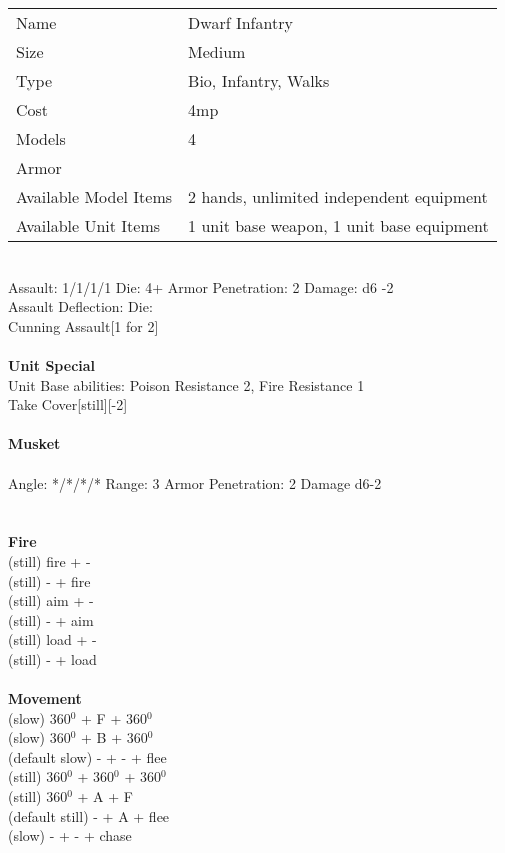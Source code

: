 \begin{tabular}{ll}
  Name & Dwarf Infantry \\
  Size & Medium\\
  Type & Bio, Infantry, Walks\\
  Cost & 4mp\\
  Models & 4\\
  Armor & \\
  Available Model Items & 2 hands, unlimited independent equipment \\
  Available Unit Items & 1 unit base weapon, 1 unit base equipment \\
\end{tabular}

\ \\
Assault: 1/1/1/1 Die: 4+ Armor Penetration: 2 Damage: d6 -2 \\
Assault Deflection:  Die: \\
\indent Cunning Assault[1 for 2] \\
\ \\

{\bf Unit Special} \\
Unit Base abilities: Poison Resistance 2, Fire Resistance 1\\ Take Cover[still][-2]
\ \\
\ \\
{\bf Musket } \\
\ \\
Angle: */*/*/* Range: 3 Armor Penetration: 2 Damage d6-2 \\
\indent  \\





\ \\ {\bf Fire } \\
(still) fire + - \\
(still) - + fire \\
(still) aim + - \\
(still) - + aim \\
(still) load + - \\
(still) - + load \\
\ \\ {\bf Movement } \\
(slow) 360$^0$ + F + 360$^0$ \\
(slow) 360$^0$ + B + 360$^0$ \\
(default slow) - + - + flee \\
(still) 360$^0$ + 360$^0$ + 360$^0$ \\
(still) 360$^0$ + A + F \\
(default still) - + A + flee \\
(slow) - + - + chase \\



